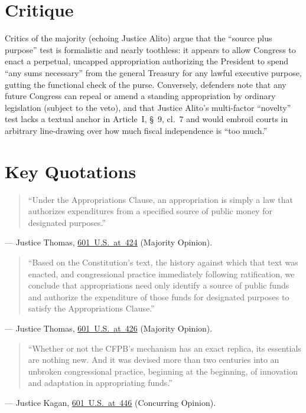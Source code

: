\documentclass[12pt]{article}
\begin{document}
\section{Critique}
Critics of the majority (echoing Justice Alito) argue that the ``source plus purpose'' test is formalistic and nearly toothless: it appears to allow Congress to enact a perpetual, uncapped appropriation authorizing the President to spend ``any sums necessary'' from the general Treasury for any lawful executive purpose, gutting the functional check of the purse. Conversely, defenders note that any future Congress can repeal or amend a standing appropriation by ordinary legislation (subject to the veto), and that Justice Alito's multi-factor ``novelty'' test lacks a textual anchor in Article~I, \S~9, cl.~7 and would embroil courts in arbitrary line-drawing over how much fiscal independence is ``too much.''

\section{Key Quotations}
\begin{quote}
``Under the Appropriations Clause, an appropriation is simply a law that authorizes expenditures from a specified source of public money for designated purposes.''
\end{quote}
\noindent --- Justice Thomas, \href{https://supreme.justia.com/cases/federal/us/601/22-448/}{601~U.S.~at~424} (Majority Opinion).

\begin{quote}
``Based on the Constitution's text, the history against which that text was enacted, and congressional practice immediately following ratification, we conclude that appropriations need only identify a source of public funds and authorize the expenditure of those funds for designated purposes to satisfy the Appropriations Clause.''
\end{quote}
\noindent --- Justice Thomas, \href{https://supreme.justia.com/cases/federal/us/601/22-448/}{601~U.S.~at~426} (Majority Opinion).

\begin{quote}
``Whether or not the CFPB's mechanism has an exact replica, its essentials are nothing new. And it was devised more than two centuries into an unbroken congressional practice, beginning at the beginning, of innovation and adaptation in appropriating funds.''
\end{quote}
\noindent --- Justice Kagan, \href{https://supreme.justia.com/cases/federal/us/601/22-448/}{601~U.S.~at~446} (Concurring Opinion).
\end{document}
